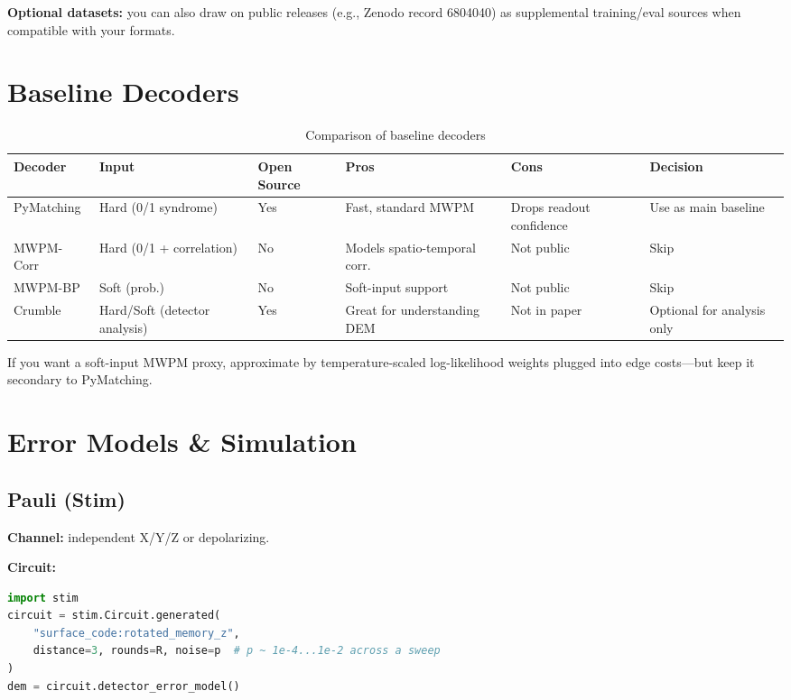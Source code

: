 \documentclass[12pt]{article}
\begin{document}
\textbf{Optional datasets:} you can also draw on public releases (e.g., Zenodo record 6804040) as supplemental training/eval sources when compatible with your formats.

\section{Baseline Decoders}

\begin{table}[H]
\centering
\small
\begin{tabular}{@{}lllllp{3cm}@{}}
\toprule
\textbf{Decoder} & \textbf{Input} & \textbf{Open Source} & \textbf{Pros} & \textbf{Cons} & \textbf{Decision} \\
\midrule
PyMatching & Hard (0/1 syndrome) & Yes  & Fast, standard MWPM & Drops readout confidence & Use as main baseline \\
MWPM-Corr & Hard (0/1 + correlation) & No & Models spatio-temporal corr. & Not public & Skip \\
MWPM-BP & Soft (prob.) & No & Soft-input support & Not public & Skip \\
Crumble & Hard/Soft (detector analysis) & Yes & Great for understanding DEM & Not in paper & Optional for analysis only \\
\bottomrule
\end{tabular}
\caption{Comparison of baseline decoders}
\end{table}

If you want a soft-input MWPM proxy, approximate by temperature-scaled log-likelihood weights plugged into edge costs—but keep it secondary to PyMatching.

\section{Error Models \& Simulation}

\subsection{Pauli (Stim)}

\textbf{Channel:} independent X/Y/Z or depolarizing.

\textbf{Circuit:}
\begin{lstlisting}[language=Python]
import stim
circuit = stim.Circuit.generated(
    "surface_code:rotated_memory_z",
    distance=3, rounds=R, noise=p  # p ~ 1e-4...1e-2 across a sweep
)
dem = circuit.detector_error_model()
\end{lstlisting}
\end{document}
